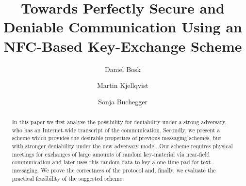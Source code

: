 \documentclass{llncs}
\begin{document}
\title{%
  Towards Perfectly Secure and Deniable Communication Using an NFC-Based 
  Key-Exchange Scheme
}
\author{%
  Daniel Bosk
  \and
  Martin Kjellqvist
  \and
  Sonja Buchegger
}

\maketitle
\begin{abstract}
  In this paper we first analyse the possibility for deniability under a strong 
  adversary, who has an Internet-wide transcript of the communication.
  Secondly, we present a scheme which provides the desirable properties of 
  previous messaging schemes, but with stronger deniability under the new 
  adversary model.
  Our scheme requires physical meetings for exchanges of large amounts of 
  random key-material via near-field communication and later uses this random 
  data to key a one-time pad for text-messaging.
  We prove the correctness of the protocol and, finally, we evaluate the 
  practical feasibility of the suggested scheme.

\end{abstract}

\acresetall



\printbibliography
\end{document}

